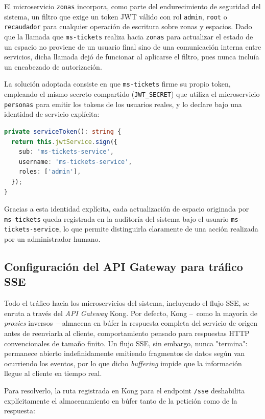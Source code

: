 \documentclass[12pt,letterpaper]{article}
\begin{document}
El microservicio \texttt{zonas} incorpora, como parte del endurecimiento de seguridad del sistema, un filtro que exige un token JWT válido con rol \texttt{admin}, \texttt{root} o \texttt{recaudador} para cualquier operación de escritura sobre zonas y espacios. Dado que la llamada que \texttt{ms-tickets} realiza hacia \texttt{zonas} para actualizar el estado de un espacio no proviene de un usuario final sino de una comunicación interna entre servicios, dicha llamada dejó de funcionar al aplicarse el filtro, pues nunca incluía un encabezado de autorización.

La solución adoptada consiste en que \texttt{ms-tickets} firme su propio token, empleando el mismo secreto compartido (\texttt{JWT\_SECRET}) que utiliza el microservicio \texttt{personas} para emitir los tokens de los usuarios reales, y lo declare bajo una identidad de servicio explícita:

\begin{lstlisting}[language=TypeScript,caption={Emisión de un token de identidad de servicio (zone-integration.service.ts)}]
private serviceToken(): string {
  return this.jwtService.sign({
    sub: 'ms-tickets-service',
    username: 'ms-tickets-service',
    roles: ['admin'],
  });
}
\end{lstlisting}

Gracias a esta identidad explícita, cada actualización de espacio originada por \texttt{ms-tickets} queda registrada en la auditoría del sistema bajo el usuario \texttt{ms-tickets-service}, lo que permite distinguirla claramente de una acción realizada por un administrador humano.

\subsection{Configuración del API Gateway para tráfico SSE}

Todo el tráfico hacia los microservicios del sistema, incluyendo el flujo SSE, se enruta a través del \emph{API Gateway} Kong. Por defecto, Kong --~como la mayoría de \emph{proxies} inversos~-- almacena en búfer la respuesta completa del servicio de origen antes de reenviarla al cliente, comportamiento pensado para respuestas HTTP convencionales de tamaño finito. Un flujo SSE, sin embargo, nunca "termina": permanece abierto indefinidamente emitiendo fragmentos de datos según van ocurriendo los eventos, por lo que dicho \emph{buffering} impide que la información llegue al cliente en tiempo real.

Para resolverlo, la ruta registrada en Kong para el endpoint \texttt{/sse} deshabilita explícitamente el almacenamiento en búfer tanto de la petición como de la respuesta:
\end{document}
